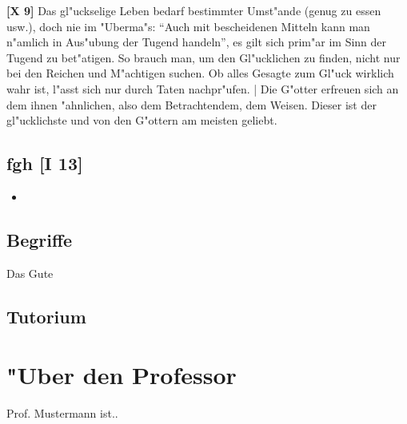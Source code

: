 \documentclass[emulatestandardclasses]{scrartcl}
\begin{document}
\noindent \textbf{[X 9]} Das gl"uckselige Leben bedarf bestimmter Umst"ande (genug zu essen usw.), doch nie im "Uberma"s: "`Auch mit bescheidenen Mitteln kann man n"amlich in Aus"ubung der Tugend handeln"', es gilt sich prim"ar im Sinn der Tugend zu bet"atigen. So brauch man, um den Gl"ucklichen zu finden, nicht nur bei den Reichen und M"achtigen suchen. Ob alles Gesagte zum Gl"uck wirklich wahr ist, l"asst sich nur durch Taten nachpr"ufen. | Die G"otter erfreuen sich an dem ihnen "ahnlichen, also dem Betrachtendem, dem Weisen. Dieser ist der gl"ucklichste und von den G"ottern am meisten geliebt.

\subsection{fgh [I 13]}

\begin{itemize}
  \item 
\end{itemize}

\subsection{Begriffe}

\begin{description}[leftmargin=!,labelwidth=\widthof{\bfseries \emph{eudaemonia}}]
  \item[\emph{agathon}] Das Gute
\end{description}

\subsection{Tutorium}



\newpage
\section{"Uber den Professor}
Prof. Mustermann ist..


\end{document}
